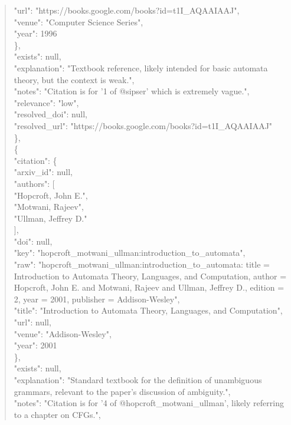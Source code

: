 \documentclass[11pt]{article}
\begin{document}
\begin{quote}
        "url": "https://books.google.com/books?id=t1I\_AQAAIAAJ",\\
        "venue": "Computer Science Series",\\
        "year": 1996\\
      \},\\
      "exists": null,\\
      "explanation": "Textbook reference, likely intended for basic automata theory, but the context is weak.",\\
      "notes": "Citation is for '1 of @sipser' which is extremely vague.",\\
      "relevance": "low",\\
      "resolved\_doi": null,\\
      "resolved\_url": "https://books.google.com/books?id=t1I\_AQAAIAAJ"\\
    \},\\
    \{\\
      "citation": \{\\
        "arxiv\_id": null,\\
        "authors": [\\
          "Hopcroft, John E.",\\
          "Motwani, Rajeev",\\
          "Ullman, Jeffrey D."\\
        ],\\
        "doi": null,\\
        "key": "hopcroft\_motwani\_ullman:introduction\_to\_automata",\\
        "raw": "hopcroft\_motwani\_ullman:introduction\_to\_automata: title = Introduction to Automata Theory, Languages, and Computation, author = Hopcroft, John E. and Motwani, Rajeev and Ullman, Jeffrey D., edition = 2, year = 2001, publisher = Addison-Wesley",\\
        "title": "Introduction to Automata Theory, Languages, and Computation",\\
        "url": null,\\
        "venue": "Addison-Wesley",\\
        "year": 2001\\
      \},\\
      "exists": null,\\
      "explanation": "Standard textbook for the definition of unambiguous grammars, relevant to the paper's discussion of ambiguity.",\\
      "notes": "Citation is for '4 of @hopcroft\_motwani\_ullman', likely referring to a chapter on CFGs.",\\

\end{quote}
\end{document}
